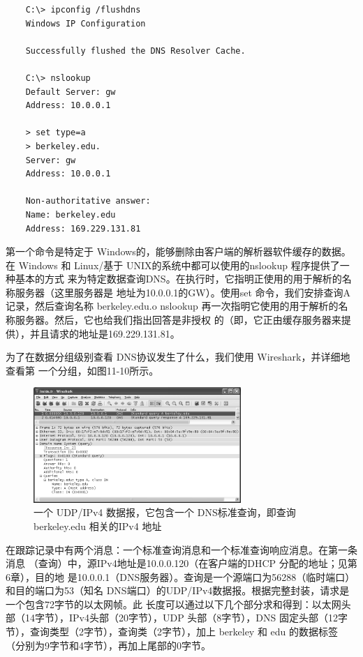 \begin{verbatim}
    C:\> ipconfig /flushdns
    Windows IP Configuration

    Successfully flushed the DNS Resolver Cache.
    
    C:\> nslookup
    Default Server: gw
    Address: 10.0.0.1
    
    > set type=a
    > berkeley.edu.
    Server: gw
    Address: 10.0.0.1
    
    Non-authoritative answer:
    Name: berkeley.edu
    Address: 169.229.131.81
\end{verbatim}

第一个命令是特定于 Windows的，能够删除由客户端的解析器软件缓存的数据。在
Windows 和 Linux/基于 UNIX的系统中都可以使用的nslookup 程序提供了一种基本的方式
来为特定数据查询DNS。在执行时，它指明正使用的用于解析的名称服务器（这里服务器是
地址为10.0.0.1的GW）。使用set 命令，我们安排查询A记录，然后查询名称 berkeley.edu.o
nslookup 再一次指明它使用的用于解析的名称服务器。然后，它也给我们指出回答是非授权
的（即，它正由缓存服务器来提供），并且请求的地址是169.229.131.81。

为了在数据分组级别查看 DNS协议发生了什么，我们使用 Wireshark，并详细地查看第
一个分组，如图11-10所示。

\begin{figure}[!htb]
    \centering
	\includegraphics[width=0.7\textwidth]{imgs/11/11-10.png}
	\caption{一个 UDP/IPv4 数据报，它包含一个 DNS标准查询，即查询 berkeley.edu 相关的IPv4 地址}
\end{figure}

在跟踪记录中有两个消息：一个标准查询消息和一个标准查询响应消息。在第一条消息
（查询）中，源IPv4地址是10.0.0.120（在客户端的DHCP 分配的地址；见第6章），目的地
是10.0.0.1（DNS服务器）。查询是一个源端口为56288（临时端口）和目的端口为53（知名
DNS端口）的UDP/IPv4数据报。根据完整封装，请求是一个包含72字节的以太网帧。此
长度可以通过以下几个部分求和得到：以太网头部（14字节），IPv4头部（20字节），UDP
头部（8字节），DNS 固定头部（12字节），查询类型（2字节），查询类（2字节），加上
berkeley 和 edu 的数据标签（分别为9字节和4字节），再加上尾部的0字节。

